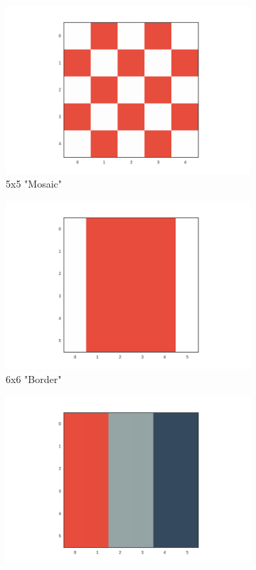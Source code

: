 \begin{figure}[h]
\centering
\begin{subfigure}[b]{.20\textwidth}
\centering
\includegraphics[width=\textwidth]{fig/mosaic}
\caption{5x5 "Mosaic"}
\end{subfigure}%
\begin{subfigure}[b]{.20\textwidth}
\centering
\includegraphics[width=\textwidth]{fig/border}
\caption{6x6 "Border"}
\end{subfigure}%
\begin{subfigure}[b]{.20\textwidth}
\centering
\includegraphics[width=\textwidth]{fig/tricolor}

\end{subfigure}
\end{figure}
